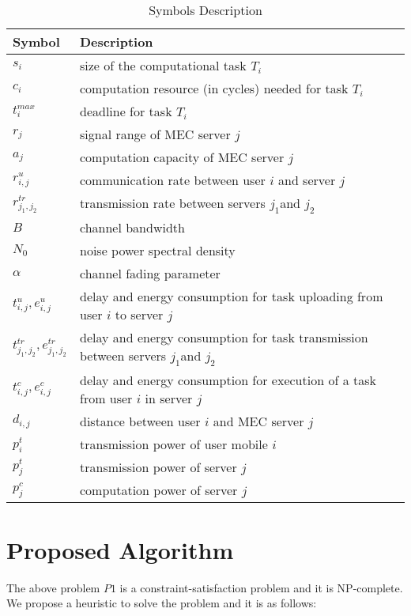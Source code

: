 \documentclass[conference]{IEEEtran}
\begin{document}
\begin{table}[htbp]
\caption{Symbols Description}
\begin{center}
\begin{tabular}{|p{0.6in}|p{2.5in}|}
\hline
\textbf{Symbol}&\textbf{Description}\\
\hline
$s_i$ & size of the computational task $T_i$  \\
\hline
$c_i$ & computation resource (in cycles) needed for task $T_i$ \\
\hline
$t_i^{max}$ & deadline for task $T_i$ \\
\hline
$r_j$ & signal range of MEC server $j$ \\
\hline
$a_j$ & computation capacity of MEC server $j$ \\
\hline
$r^u_{i,j}$ & communication rate between user $i$ and server $j$ \\
\hline
$r^{tr}_{j_1,j_2}$ & transmission rate between servers $j_1$and $j_2$ \\
\hline
$B$ & channel bandwidth \\
\hline
$N_0$ & noise power spectral density \\
\hline
$\alpha$ & channel fading parameter \\
\hline
$t^u_{i,j}, e^u_{i,j}$ & delay and energy consumption for task uploading from user $i$ to server $j$ \\
\hline
$t^{tr}_{j_1,j_2}, e^{tr}_{j_1,j_2}$ & delay and energy consumption for task transmission between servers $j_1$and $j_2$ \\
\hline
$t^c_{i,j}, e^c_{i,j}$ & delay and energy consumption for execution of a task from user $i$ in server $j$  \\
\hline
$d_{i,j}$ & distance between user $i$ and MEC server $j$ \\
\hline
$p_i^t$ & transmission power of user mobile $i$ \\
\hline
$p_j^t$ & transmission power of server $j$ \\
\hline
$p_j^c$ & computation power of server $j$ \\
\hline
\end{tabular}
\label{tab1}
\end{center}
\end{table}


\section{ Proposed Algorithm}

 The above problem $P1$ is a constraint-satisfaction problem and it is NP-complete. We propose a heuristic to solve the problem and it is as follows: 
\end{document}
